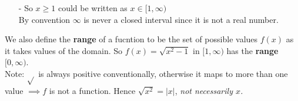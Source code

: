 \begin{itemize}
\item[-] So $x \geq 1$ could be written as $x \in [1,\infty)$\\
By convention $\infty$ is never a closed interval since it is not a real number.\\
\end{itemize}


We also define the \textbf{range} of a fucntion to be the set of possible values $f(x)$ as it takes values of the domain.
So $f(x) = \sqrt{x^2 -1 }$ in $[1,\infty)$ has the \textbf{range} $[0,\infty)$.\\

Note: $\sqrt{}$ is always positive conventionally, otherwise it maps to more than one value $\implies f$ is not a function. Hence $\sqrt{x^2} = |x|$, \textit{not necessarily $x$.}\\




